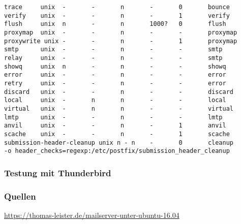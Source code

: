 \begin{lstlisting}[caption=master.cf - Postfix]
trace     unix  -       -       n       -       0       bounce
verify    unix  -       -       n       -       1       verify
flush     unix  n       -       n       1000?   0       flush
proxymap  unix  -       -       n       -       -       proxymap
proxywrite unix -       -       n       -       1       proxymap
smtp      unix  -       -       n       -       -       smtp
relay     unix  -       -       n       -       -       smtp
showq     unix  n       -       n       -       -       showq
error     unix  -       -       n       -       -       error
retry     unix  -       -       n       -       -       error
discard   unix  -       -       n       -       -       discard
local     unix  -       n       n       -       -       local
virtual   unix  -       n       n       -       -       virtual
lmtp      unix  -       -       n       -       -       lmtp
anvil     unix  -       -       n       -       1       anvil
scache    unix  -       -       n       -       1       scache
submission-header-cleanup unix n - n    -       0       cleanup
-o header_checks=regexp:/etc/postfix/submission_header_cleanup
\end{lstlisting}




\subsubsection{Testung mit Thunderbird}


\subsubsection{Quellen}
\url{https://thomas-leister.de/mailserver-unter-ubuntu-16.04}



